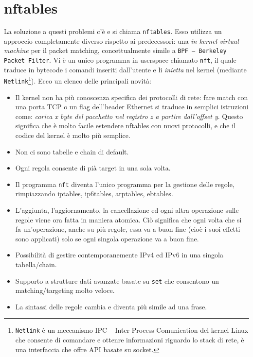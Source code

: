 \section{nftables}

La soluzione a questi problemi c'è e si chiama \texttt{nftables}.
Esso utilizza un approccio completamente diverso rispetto ai predecessori: una
\textit{in-kernel virtual machine} per il packet matching, concettualmente
simile a \texttt{BPF -- Berkeley Packet Filter}.
Vi è un unico programma in userspace chiamato
\texttt{nft}, il quale traduce in bytecode i comandi inseriti dall'utente e li
\textit{inietta} nel kernel (mediante \texttt{Netlink}\footnote{\texttt{Netlink}
è un meccanismo IPC -- Inter-Process Comunication del kernel Linux che consente
di comandare e ottenre informazioni riguardo lo stack di rete, è una interfaccia
che offre API basate su socket.}). Ecco un elenco
delle principali novità:
\begin{itemize}
  \item Il kernel non ha più conoscenza specifica
  dei protocolli di rete: fare match con una porta TCP o un flag dell'header Ethernet
  si traduce in semplici istruzioni come: \textit{carica x byte del pacchetto nel
  registro z a partire dall'offset y}. Questo significa che è molto facile estendere
  nftables con nuovi protocolli, e che il codice del kernel è molto più semplice.
  \item Non ci sono tabelle e chain di default.
  \item Ogni regola consente di pià target in una sola volta.
  \item Il programma \texttt{nft} diventa l'unico programma per la gestione delle regole,
  rimpiazzando iptables, ip6tables, arptables, ebtables.
  \item L'aggiunta, l'aggiornamento, la cancellazione ed ogni altra operazione
  sulle regole viene ora fatta in maniera atomica. Ciò significa che ogni volta che
  si fa un'operazione, anche su più regole, essa va a buon fine (cioè i suoi effetti
  sono applicati) solo se ogni singola operazione va a buon fine.
  \item Possibilità di gestire contemporanemente IPv4 ed IPv6 in una singola tabella/chain.
  \item Supporto a strutture dati avanzate basate su \texttt{set} che consentono un matching/targeting
  molto veloce.
  \item La sintassi delle regole cambia e diventa più simile ad una frase.
\end{itemize}

